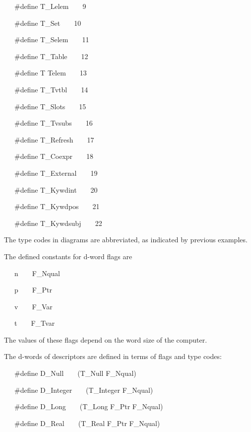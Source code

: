 {\ttfamily\mdseries
\ \ \ \#define T\_Lelem\ \ \ \ 9}

{\ttfamily\mdseries
\ \ \ \#define T\_Set\ \ \ \ 10}

{\ttfamily\mdseries
\ \ \ \#define T\_Selem\ \ \ \ 11}

{\ttfamily\mdseries
\ \ \ \#define T\_Table\ \ \ \ 12}

{\ttfamily\mdseries
\ \ \ \#define T Telem\ \ \ \ 13}

{\ttfamily\mdseries
\ \ \ \#define T\_Tvtbl\ \ \ \ 14}

{\ttfamily\mdseries
\ \ \ \#define T\_Slots\ \ \ \ 15}

{\ttfamily\mdseries
\ \ \ \#define T\_Tvsubs\ \ \ \ 16}

{\ttfamily\mdseries
\ \ \ \#define T\_Refresh\ \ \ \ 17}

{\ttfamily\mdseries
\ \ \ \#define T\_Coexpr\ \ \ \ 18}

{\ttfamily\mdseries
\ \ \ \#define T\_External\ \ \ \ 19}

{\ttfamily\mdseries
\ \ \ \#define T\_Kywdint\ \ \ \ 20}

{\ttfamily\mdseries
\ \ \ \#define T\_Kywdpos\ \ \ \ 21}

{\ttfamily\mdseries
\ \ \ \#define T\_Kywdsubj\ \ \ \ 22}


The type codes in diagrams are abbreviated, as indicated by previous examples.


The defined constants for d-word flags are

{\ttfamily\mdseries
\ \ \ n\ \ \ \ F\_Nqual}

{\ttfamily\mdseries
\ \ \ p\ \ \ \ F\_Ptr}

{\ttfamily\mdseries
\ \ \ v\ \ \ \ F\_Var}

{\ttfamily\mdseries
\ \ \ t\ \ \ \ F\_Tvar}

The values of these flags depend on the word size of the computer.


The d-words of descriptors are defined in terms of flags and type codes:

{\ttfamily\mdseries
\ \ \ \#define D\_Null\ \ \ \ (T\_Null {\textbar} F\_Nqual)}

{\ttfamily\mdseries
\ \ \ \#define D\_Integer\ \ \ \ (T\_Integer {\textbar} F\_Nqual)}

{\ttfamily\mdseries
\ \ \ \#define D\_Long\ \ \ \ (T\_Long {\textbar} F\_Ptr {\textbar} F\_Nqual)}

{\ttfamily\mdseries
\ \ \ \#define D\_Real\ \ \ \ (T\_Real {\textbar} F\_Ptr {\textbar} F\_Nqual)}

